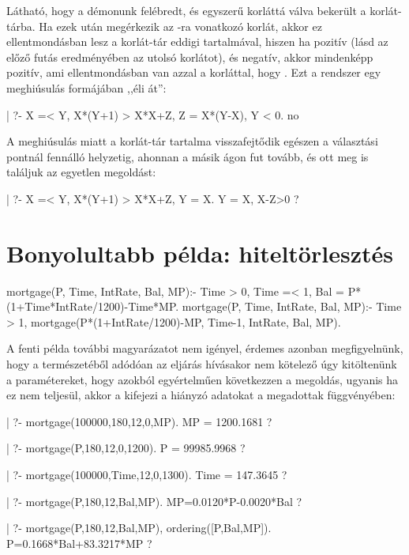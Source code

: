 Látható, hogy a démonunk felébredt, és egyszerű korláttá válva bekerült a
korlát-tárba. Ha ezek után megérkezik az -ra vonatkozó korlát, akkor
ez ellentmondásban lesz a korlát-tár eddigi tartalmával, hiszen ha 
pozitív (lásd az előző futás eredményében az utolsó korlátot), és 
negatív, akkor  mindenképp pozitív, ami ellentmondásban van azzal
a korláttal, hogy . Ezt a rendszer egy meghiúsulás formájában
,,éli át'':

\begin{prologcode}
| ?- {X =< Y}, {X*(Y+1) > X*X+Z}, Z = X*(Y-X), {Y < 0}.
                        no
\end{prologcode}

A meghiúsulás miatt a korlát-tár tartalma visszafejtődik egészen a választási
pontnál fennálló helyzetig, ahonnan a másik ágon fut tovább, és ott meg is
találjuk az egyetlen megoldást:

\begin{prologcode}
| ?- {X =< Y}, {X*(Y+1) > X*X+Z}, Y = X.
                        Y = X, {X-Z>0} ? 
\end{prologcode}

\section{Bonyolultabb \clpq példa: hiteltörlesztés}

\begin{prologcode}
mortgage(P, Time, IntRate, Bal, MP):-
     {Time > 0, Time =< 1,
     Bal = P*(1+Time*IntRate/1200)-Time*MP}.
mortgage(P, Time, IntRate, Bal, MP):-
     {Time > 1},
     mortgage(P*(1+IntRate/1200)-MP, 
              Time-1, IntRate, Bal, MP).
\end{prologcode}

A fenti \clpq példa további magyarázatot nem igényel, érdemes azonban
megfigyelnünk, hogy a \clpq természetéből adódóan az eljárás hívásakor
nem kötelező úgy kitöltenünk a paramétereket, hogy azokból egyértelműen
következzen a megoldás, ugyanis ha ez nem teljesül, akkor a \clpq
kifejezi a hiányzó adatokat a megadottak függvényében:

\begin{prologcode}
| ?- mortgage(100000,180,12,0,MP).
MP = 1200.1681 ? 

| ?- mortgage(P,180,12,0,1200).         
P = 99985.9968 ? 

| ?- mortgage(100000,Time,12,0,1300).   
Time = 147.3645 ? 

| ?- mortgage(P,180,12,Bal,MP). 
{MP=0.0120*P-0.0020*Bal} ? 

| ?- mortgage(P,180,12,Bal,MP), ordering([P,Bal,MP]).
{P=0.1668*Bal+83.3217*MP} ? 
\end{prologcode}

